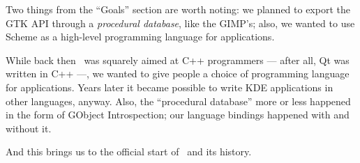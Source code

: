 Two things from the ``Goals'' section are worth noting:
we planned to export the \gls{GTK} API through a {\em
  procedural database}, like the \gls{GIMP}'s; also, we
wanted to use Scheme as a high-level programming language
for applications.

While back then \KDE\ was squarely aimed at C++
programmers --- after all, Qt was written in C++ ---, we
wanted to give people a choice of programming language
for applications.  Years later it became possible to
write KDE applications in other languages, anyway.  Also,
the ``procedural database'' more or less happened in the
form of GObject Introspection; our language bindings
happened with and without it. %

And this brings us to the official start of \GNOME\ and its
history.
